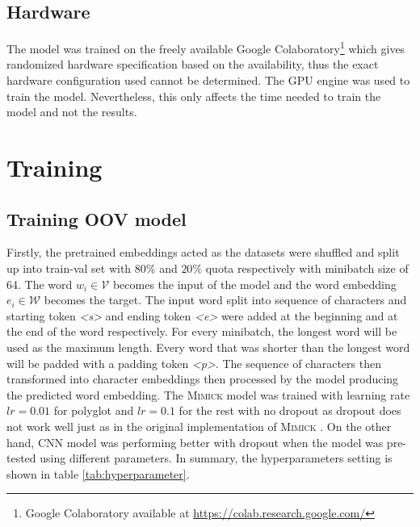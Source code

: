     \subsection{Hardware}
        The model was trained on the freely available Google
        Colaboratory\footnote{Google Colaboratory available at
        \url{https://colab.research.google.com/}} which gives
        randomized hardware specification based on the availability,
        thus the exact hardware configuration used cannot be
        determined. The GPU engine was used to train the model.
        Nevertheless, this only affects the time needed to train the
        model and not the results.

\section{Training}
    \subsection{Training OOV model}
        Firstly, the pretrained embeddings acted as the datasets were
        shuffled and split up into train-val set with $80\%$ and
        $20\%$ quota respectively with minibatch size of 64. The word
        $w_i \in \mathcal{V}$ becomes the input of the model and the
        word embedding $e_i \in \mathcal{W}$ becomes the target. The
        input word split into sequence of characters and starting
        token \textit{\textless s\textgreater} and ending token
        \textit{\textless e\textgreater} were added at the beginning
        and at the end of the word respectively. For every minibatch,
        the longest word will be used as the maximum length. Every
        word that was shorter than the longest word will be padded
        with a padding token \textit{\textless p\textgreater}.
        The sequence of characters then transformed into character
        embeddings then processed by the model producing the predicted
        word embedding. The \textsc{Mimick} model was trained with
        learning rate $lr = 0.01$ for polyglot and $lr = 0.1$ for the
        rest with no dropout as dropout does not work well just as in
        the original implementation of \textsc{Mimick}
        \citep{mimicking2017Pinter}. On the other hand, CNN model was
        performing better with dropout when the model was pre-tested
        using different parameters. In summary, the hyperparameters
        setting is shown in table \ref{tab:hyperparameter}.

